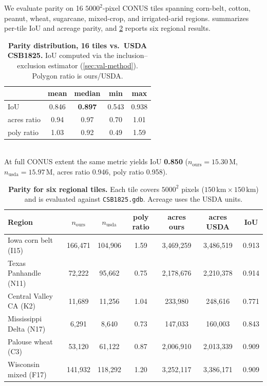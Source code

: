 \documentclass[preprint,12pt]{elsarticle}
\begin{document}
We evaluate parity on 16 $5000^2$-pixel CONUS tiles spanning corn-belt,
cotton, peanut, wheat, sugarcane, mixed-crop, and irrigated-arid regions.
 summarizes per-tile IoU and acreage parity, and
\cref{tab:parity-detail} reports six regional results.

\begin{table}[t]
\centering
\caption{\textbf{Parity distribution, 16 tiles vs.\ USDA CSB1825.}
IoU computed via the inclusion--exclusion estimator
(\cref{sec:val-method}). Polygon ratio is ours/USDA.}
\label{tab:parity-summary}
\small
\begin{tabular}{lcccc}
\toprule
                & mean & median & min & max \\
\midrule
IoU             & 0.846 & \textbf{0.897} & 0.543 & 0.938 \\
acres ratio     & 0.94  & 0.97           & 0.70  & 1.01 \\
poly ratio      & 1.03  & 0.92           & 0.49  & 1.59 \\
\bottomrule
\end{tabular}
\vspace{0.4em}\\
At full CONUS extent the same metric yields IoU \textbf{0.850}
($n_\text{ours}{=}15.30\,\text{M}$, $n_\text{usda}{=}15.97\,\text{M}$,
acres ratio 0.946, poly ratio 0.958).
\end{table}

\begin{table}[t]
\centering
\caption{\textbf{Parity for six regional tiles.} Each tile covers
$5000^2$ pixels ($150\,\text{km} \times 150\,\text{km}$) and is evaluated
against \texttt{CSB1825.gdb}. Acreage uses the USDA units.}
\label{tab:parity-detail}
\footnotesize
\setlength{\tabcolsep}{4pt}
\begin{tabular}{lcccccc}
\toprule
Region & $n_\text{ours}$ & $n_\text{usda}$ & poly ratio & acres ours & acres USDA & IoU \\
\midrule
Iowa corn belt (I15)        & 166{,}471 & 104{,}906 & 1.59 & 3{,}469{,}259 & 3{,}486{,}519 & 0.913 \\
Texas Panhandle (N11)       &  72{,}222 &  95{,}662 & 0.75 & 2{,}178{,}676 & 2{,}210{,}378 & 0.914 \\
Central Valley CA (K2)      &  11{,}689 &  11{,}256 & 1.04 &   233{,}980   &   248{,}616   & 0.771 \\
Mississippi Delta (N17)     &   6{,}291 &   8{,}640 & 0.73 &   147{,}033   &   160{,}003   & 0.843 \\
Palouse wheat (C3)          &  53{,}120 &  61{,}122 & 0.87 & 2{,}006{,}910 & 2{,}013{,}339 & 0.909 \\
Wisconsin mixed (F17)       & 141{,}932 & 118{,}292 & 1.20 & 3{,}252{,}117 & 3{,}386{,}171 & 0.909 \\
\bottomrule
\end{tabular}
\end{table}
\end{document}
